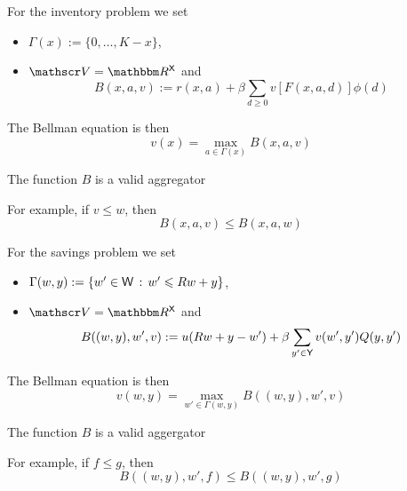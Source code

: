 \begin{frame}
    

    \Eg For the inventory problem we set 
    \begin{itemize}
        \item $\Gamma(x) := \{0, \ldots, K - x\}$,
        \vspace{0.3em}
        \item $\vV = \RR^\Xsf$ and
        \begin{equation*}
            B(x, a, v) :=
                r(x, a)
                + \beta
                \sum_{d \geq 0} v[F(x,a,d)] \phi(d)
        \end{equation*}
    \end{itemize}

    The Bellman equation is then 
    $$v(x) = \max_{a \in \Gamma(x)} B(x, a, v)$$

    The function $B$ is a valid aggregator

        \vspace{0.3em}
    For example, if $v \leq w$, then
    \begin{equation*}
        B(x, a, v) \leq B(x, a, w)
    \end{equation*}

\end{frame}


\begin{frame}
    

    \Eg For the savings problem we set 
    \begin{itemize}
        \item $\Gamma(w, y) := \{w' \in \mathsf W \,:\, w' \leqslant Rw + y\}$,
        \vspace{0.3em}
        \item $\vV = \RR^\Xsf$ and
        \begin{equation*}
            B((w,y), w', v) :=
            u(R w + y - w')
            + \beta \sum_{y' \in \mathsf Y} v(w', y') Q(y, y')
        \end{equation*}
    \end{itemize}

    The Bellman equation is then 
    $$v(w, y) = \max_{w' \in \Gamma(w, y)} B((w, y), w', v)$$

    The function $B$ is a valid aggergator

        \vspace{0.3em}
    For example, if $f \leq g$, then
    \begin{equation*}
        B((w,y), w', f) \leq B((w,y), w', g)
    \end{equation*}

\end{frame}


